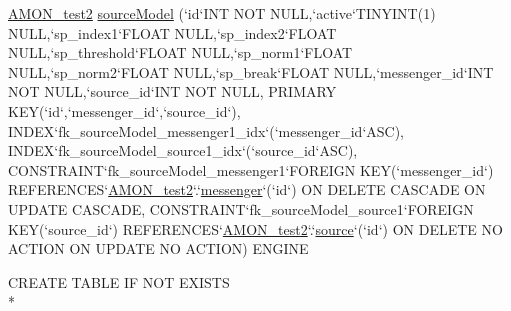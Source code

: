 \begin{DoxyCompactItemize}
\hyperlink{db__mc__build_8sql_a19c21c59303d8b6591b92240ff7de1d5}{A\-M\-O\-N\-\_\-test2} \hyperlink{db__mc__build_8sql_a623797c037cb18b880ed6982ebd22fc4}{source\-Model} (`id`I\-N\-T N\-O\-T N\-U\-L\-L,`active`T\-I\-N\-Y\-I\-N\-T(1) N\-U\-L\-L,`sp\-\_\-index1`F\-L\-O\-A\-T N\-U\-L\-L,`sp\-\_\-index2`F\-L\-O\-A\-T N\-U\-L\-L,`sp\-\_\-threshold`F\-L\-O\-A\-T N\-U\-L\-L,`sp\-\_\-norm1`F\-L\-O\-A\-T N\-U\-L\-L,`sp\-\_\-norm2`F\-L\-O\-A\-T N\-U\-L\-L,`sp\-\_\-break`F\-L\-O\-A\-T N\-U\-L\-L,`messenger\-\_\-id`I\-N\-T N\-O\-T N\-U\-L\-L,`source\-\_\-id`I\-N\-T N\-O\-T N\-U\-L\-L, P\-R\-I\-M\-A\-R\-Y K\-E\-Y(`id`,`messenger\-\_\-id`,`source\-\_\-id`), I\-N\-D\-E\-X`fk\-\_\-source\-Model\-\_\-messenger1\-\_\-idx`(`messenger\-\_\-id`A\-S\-C), I\-N\-D\-E\-X`fk\-\_\-source\-Model\-\_\-source1\-\_\-idx`(`source\-\_\-id`A\-S\-C), C\-O\-N\-S\-T\-R\-A\-I\-N\-T`fk\-\_\-source\-Model\-\_\-messenger1`F\-O\-R\-E\-I\-G\-N K\-E\-Y(`messenger\-\_\-id`) R\-E\-F\-E\-R\-E\-N\-C\-E\-S`\hyperlink{db__mc__build_8sql_a19c21c59303d8b6591b92240ff7de1d5}{A\-M\-O\-N\-\_\-test2}`.`\hyperlink{db__mc__build_8sql_a2eb25ad52c04da73aa8331b9c9d29cce}{messenger}`(`id`) O\-N D\-E\-L\-E\-T\-E C\-A\-S\-C\-A\-D\-E O\-N U\-P\-D\-A\-T\-E C\-A\-S\-C\-A\-D\-E, C\-O\-N\-S\-T\-R\-A\-I\-N\-T`fk\-\_\-source\-Model\-\_\-source1`F\-O\-R\-E\-I\-G\-N K\-E\-Y(`source\-\_\-id`) R\-E\-F\-E\-R\-E\-N\-C\-E\-S`\hyperlink{db__mc__build_8sql_a19c21c59303d8b6591b92240ff7de1d5}{A\-M\-O\-N\-\_\-test2}`.`\hyperlink{db__mc__build_8sql_a2da1ba01fa2a751239f57c1c5fbcecc8}{source}`(`id`) O\-N D\-E\-L\-E\-T\-E N\-O A\-C\-T\-I\-O\-N O\-N U\-P\-D\-A\-T\-E N\-O A\-C\-T\-I\-O\-N) E\-N\-G\-I\-N\-E
\item 
C\-R\-E\-A\-T\-E T\-A\-B\-L\-E I\-F N\-O\-T E\-X\-I\-S\-T\-S \\*

\end{DoxyCompactItemize}

